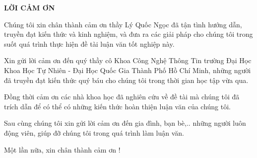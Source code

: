 \vspace{2cm}
	
{}

{\MakeUppercase\centering\Large\bfseries LỜI CẢM ƠN}


\vspace{2cm}
{

Chúng tôi xin chân thành cảm ơn thầy Lý Quốc Ngọc đã tận tình hướng dẫn, truyền đạt kiến thức và kinh nghiệm, và đưa ra các giải pháp cho chúng tôi trong suốt quá trình thực hiện đề tài luận văn tốt nghiệp này.

Xin gửi lời cảm ơn đến quý thầy cô Khoa Công Nghệ Thông Tin trường Đại Học Khoa Học Tự Nhiên - Đại Học Quốc Gia Thành Phố Hồ Chí Minh, những người đã truyền đạt kiến thức quý báu cho chúng tôi trong thời gian học tập vừa qua.

Đồng thời cảm ơn các nhà khoa học đã nghiên cứu về đề tài mà chúng tôi đã trích dẫn để có thể có những kiến thức hoàn thiện luận văn của chúng tôi.

Sau cùng chúng tôi xin gửi lời cảm ơn đến gia đình, bạn bè,.. những người luôn động viên, giúp đỡ chúng tôi trong quá trình làm luận văn. 

Một lần nữa, xin chân thành cảm ơn !
}

\pagebreak
